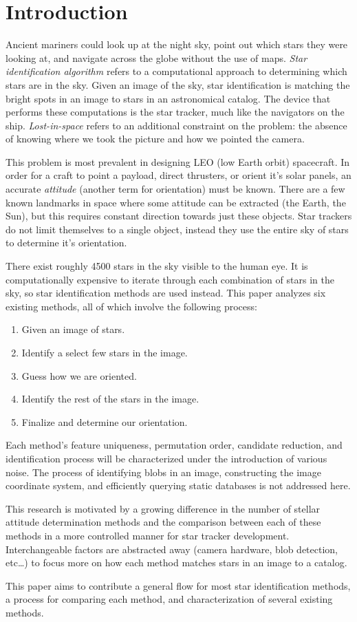 \section{Introduction}\label{sec:introduction}
Ancient mariners could look up at the night sky, point out which stars they were looking at, and navigate across the
globe without the use of maps.
\textit{Star identification algorithm} refers to a computational approach to determining which stars are in the sky.
Given an image of the sky, star identification is matching the bright spots in an image to stars in an astronomical
catalog.
The device that performs these computations is the star tracker, much like the navigators on the ship.
\textit{Lost-in-space} refers to an additional constraint on the problem: the absence of knowing where we took
the picture and how we pointed the camera.

This problem is most prevalent in designing LEO (low Earth orbit) spacecraft.
In order for a craft to point a payload, direct thrusters, or orient it's solar panels, an accurate
\textit{attitude} (another term for orientation) must be known.
There are a few known landmarks in space where some attitude can be extracted (the Earth, the Sun), but this
requires constant direction towards just these objects.
Star trackers do not limit themselves to a single object, instead they use the entire sky of stars to determine it's
orientation.

There exist roughly 4500 stars in the sky visible to the human eye.
It is computationally expensive to iterate through each combination of stars in the sky, so star identification methods
are used instead.
This paper analyzes six existing methods, all of which involve the following process:
\begin{enumerate}
    \item Given an image of stars.
    \item Identify a select few stars in the image.
    \item Guess how we are oriented.
    \item Identify the rest of the stars in the image.
    \item Finalize and determine our orientation.
\end{enumerate}

Each method's feature uniqueness, permutation order, candidate reduction, and identification process will be
characterized under the introduction of various noise.
The process of identifying blobs in an image, constructing the image coordinate system, and efficiently querying
static databases is not addressed here.

This research is motivated by a growing difference in the number of stellar attitude determination methods and the
comparison between each of these methods in a more controlled manner for star tracker development.
Interchangeable factors are abstracted away (camera hardware, blob detection, etc\ldots) to focus more on how each
method matches stars in an image to a catalog.

This paper aims to contribute a general flow for most star identification methods, a process for comparing each
method, and characterization of several existing methods.
